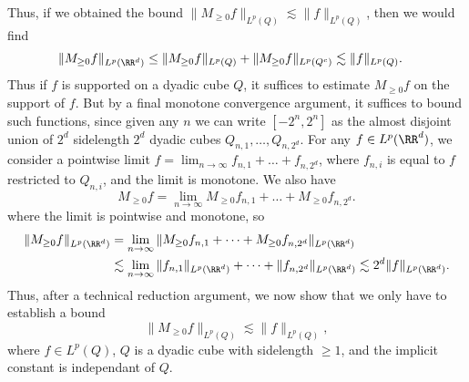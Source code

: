 %
Thus, if we obtained the bound $\| M_{\geq 0} f \|_{L^p(Q)} \lesssim \| f \|_{L^p(Q)}$, then we would find
%
\begin{align*}
  \| M_{\geq 0} f \|_{L^p(\RR^d)} &\leq \| M_{\geq 0} f \|_{L^p(Q)} + \| M_{\geq 0} f \|_{L^p(Q^c)} \lesssim \| f \|_{L^p(Q)}.
\end{align*}
%
Thus if $f$ is supported on a dyadic cube $Q$, it suffices to estimate $M_{\geq 0} f$ on the support of $f$. But by a final monotone convergence argument, it suffices to bound such functions, since given any $n$ we can write $[-2^n,2^n]$ as the almost disjoint union of $2^d$ sidelength $2^d$ dyadic cubes $Q_{n,1},\dots,Q_{n,2^d}$. For any $f \in L^p(\RR^d)$, we consider a pointwise limit $f = \lim_{n \to \infty} f_{n,1} + \dots + f_{n,2^d}$, where $f_{n,i}$ is equal to $f$ restricted to $Q_{n,i}$, and the limit is monotone. We also have
%
\[ M_{\geq 0} f = \lim_{n \to \infty} M_{\geq 0} f_{n,1} + \dots + M_{\geq 0} f_{n,2^d}. \]
%
where the limit is pointwise and monotone, so
%
\begin{align*}
  \| M_{\geq 0} f \|_{L^p(\RR^d)} &= \lim_{n \to \infty} \| M_{\geq 0} f_{n,1} + \dots + M_{\geq 0} f_{n,2^d} \|_{L^p(\RR^d)}\\
  &\lesssim \lim_{n \to \infty} \| f_{n,1} \|_{L^p(\RR^d)} + \dots + \| f_{n,2^d} \|_{L^p(\RR^d)} \lesssim 2^d \| f \|_{L^p(\RR^d)}.
\end{align*}
%
Thus, after a technical reduction argument, we now show that we only have to establish a bound
%
\[ \| M_{\geq 0} f \|_{L^p(Q)} \lesssim \| f \|_{L^p(Q)}, \]
%
where $f \in L^p(Q)$, $Q$ is a dyadic cube with sidelength $\geq 1$, and the implicit constant is independant of $Q$.

